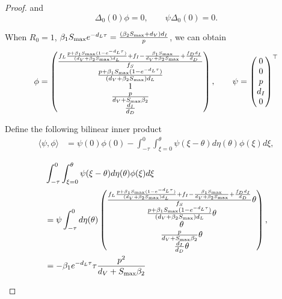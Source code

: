 \documentclass{CMHPhD-SIVD}
\begin{document}
\begin{proof}
and
\begin{equation}\label{29}
     \Delta_0(0)\phi=0,\,\,\,\,\,\,\,\,\,\,\,\, \psi\Delta_0(0)=0.
\end{equation}

When $R_0=1$, $\beta_1 S_{\text{max}} e^{-d_L \tau}=\frac{(\beta_2 S_{\text{max}}+d_V)d_I}{p}$, we can obtain
\begin{equation}
\phi=\begin{pmatrix}
\frac{f_L\frac{p+\beta_1S_{\text{max}}(1-e^{-d_L \tau})}{(d_V+\beta_2 S_{\text{max}})d_L}+f_I-\frac{\beta_1 S_{\text{max}}}{d_V+\beta_2 S_{\text{max}}}+\frac{f_Dd_I}{d_D}}{f_S} \\
\frac{p+\beta_1S_{\text{max}}(1-e^{-d_L \tau})}{(d_V+\beta_2 S_{\text{max}})d_L}\\
1 \\
\frac{p}{d_V+S_{\text{max}}\beta_2}\\
\frac{d_I}{d_D}
\end{pmatrix},\,\,\,\,\,\,\,\,\,\,\,\,
\psi=\begin{pmatrix}
0 \\
0 \\
p \\
d_I\\
0
\end{pmatrix} ^\top
\end{equation}


Define the following bilinear inner product
\begin{align}\label{30}
\langle \psi,\phi \rangle &=\psi(0)\phi(0)-\int^{0}_{-\tau}\int^{\theta}_{\xi=0}\psi
                                      (\xi-\theta)d\eta(\theta)\phi(\xi)d\xi,
\end{align}

\begin{small}
\begin{align}\label{31}
&\int^{0}_{-\tau}\int^{\theta}_{\xi=0}\psi(\xi-\theta)d\eta(\theta)\phi(\xi)d\xi\nonumber \\
&=\psi \int^{0}_{-\tau}d\eta(\theta)
\begin{pmatrix}
\frac{f_L\frac{p+\beta_1S_{\text{max}}(1-e^{-d_L \tau})}{(d_V+\beta_2 S_{\text{max}})d_L}+f_I-\frac{\beta_1 S_{\text{max}}}{d_V+\beta_2 S_{\text{max}}}+\frac{f_Dd_I}{d_D}}{f_S} \theta\\
\frac{p+\beta_1S_{\text{max}}(1-e^{-d_L \tau})}{(d_V+\beta_2 S_{\text{max}})d_L} \theta\\
\theta \\
\frac{p}{d_V+S_{\text{max}}\beta_2}\theta\\
\frac{d_I}{d_D}\theta
\end{pmatrix},\nonumber \\
&=-\beta_1 e^{-d_L \tau} \tau \frac{p^2}{d_V+S_{\text{max}}\beta_2}
\end{align}
\end{small}


\end{proof}
\end{document}
